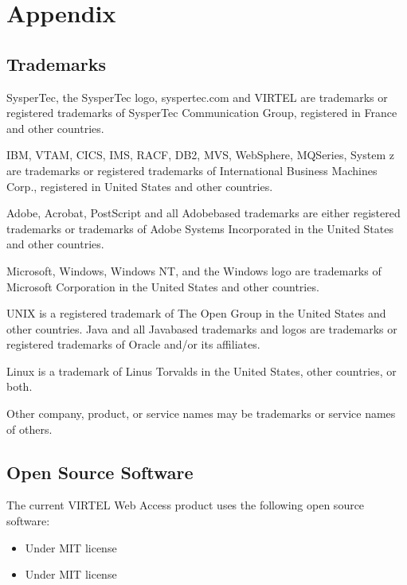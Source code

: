 \documentclass[letterpaper,10pt,english]{sphinxmanual}
\begin{document}
\chapter{Appendix}
\label{\detokenize{audit_operations_ and_performance:appendix}}

\section{Trademarks}
\label{\detokenize{audit_operations_ and_performance:trademarks}}
\sphinxAtStartPar
SysperTec, the SysperTec logo, syspertec.com and VIRTEL are trademarks or registered trademarks of SysperTec Communication Group, registered in France and other countries.

\sphinxAtStartPar
IBM, VTAM, CICS, IMS, RACF, DB2, MVS, WebSphere, MQSeries, System z are trademarks or registered trademarks of International Business Machines Corp., registered in United States and other countries.

\sphinxAtStartPar
Adobe, Acrobat, PostScript and all Adobe\sphinxhyphen{}based trademarks are either registered trademarks or trademarks of Adobe Systems Incorporated in the United States and other countries.

\sphinxAtStartPar
Microsoft, Windows, Windows NT, and the Windows logo are trademarks of Microsoft Corporation in the United States and other countries.

\sphinxAtStartPar
UNIX is a registered trademark of The Open Group in the United States and other countries. Java and all Java\sphinxhyphen{}based trademarks and logos are trademarks or registered trademarks of Oracle and/or its affiliates.

\sphinxAtStartPar
Linux is a trademark of Linus Torvalds in the United States, other countries, or both.

\sphinxAtStartPar
Other company, product, or service names may be trademarks or service names of others.


\section{Open Source Software}
\label{\detokenize{audit_operations_ and_performance:open-source-software}}
\sphinxAtStartPar
The current VIRTEL Web Access product uses the following open source software:
\begin{itemize}
\item {} \begin{description}
\sphinxAtStartPar
Under MIT license \sphinxhyphen{} 

\end{description}

\item {} \begin{description}
\sphinxAtStartPar
Under MIT license \sphinxhyphen{} 

\end{description}

\end{itemize}



\renewcommand{\indexname}{Index}
\printindex
\end{document}
